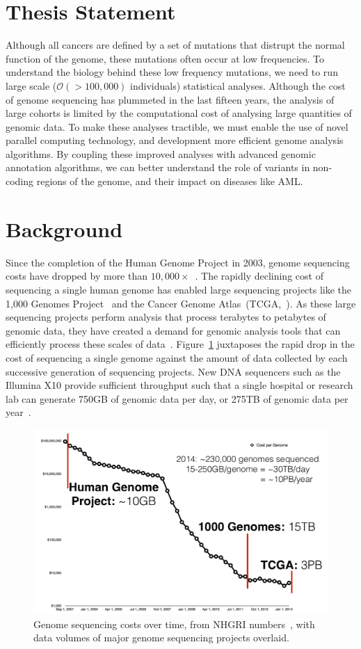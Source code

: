 \documentclass[11pt]{article} %
\begin{document}
\section{Thesis Statement}

Although all cancers are defined by a set of mutations that distrupt the normal function
of the genome, these mutations often occur at low frequencies. To understand the biology
behind these low frequency mutations, we need to run large scale ($\mathcal{O}(>100,000)$
individuals) statistical analyses. Although the cost of genome sequencing has plummeted
in the last fifteen years, the analysis of large cohorts is limited by the computational
cost of analysing large quantities of genomic data. To make these analyses tractible, we
must enable the use of novel parallel computing technology, and development more efficient
genome analysis algorithms. By coupling these improved analyses with advanced genomic
annotation algorithms, we can better understand the role of variants in non-coding regions
of the genome, and their impact on diseases like AML.

\section{Background}

Since the completion of the Human Genome Project in 2003, genome sequencing costs have dropped
by more than $10,000\times$~\cite{nhgri}. The rapidly declining cost of sequencing a single human
genome has enabled large sequencing projects like the 1,000 Genomes Project~\cite{siva08} and
the Cancer Genome Atlas~(TCGA,~\cite{weinstein13}). As these large sequencing projects perform
analysis that process terabytes to petabytes of genomic data, they have created a demand
for genomic analysis tools that can efficiently process these scales of
data~\cite{schadt10, stein10}. Figure~\ref{fig:sequencing-costs} juxtaposes the rapid drop
in the cost of sequencing a single genome against the amount of data collected by each successive
generation of sequencing projects. New DNA sequencers such as the Illumina X10 provide
sufficient throughput such that a single hospital or research lab can generate 750GB of genomic
data per day, or 275TB of genomic data per year~\cite{illumina-x10}.

\begin{figure}[h]
\begin{center}
\includegraphics[width=0.6\linewidth]{genome-sequencing.pdf}
\caption{Genome sequencing costs over time, from NHGRI numbers~\cite{nhgri}, with
data volumes of major genome sequencing projects overlaid.}
\label{fig:sequencing-costs}
\end{center}
\end{figure}
\end{document}
